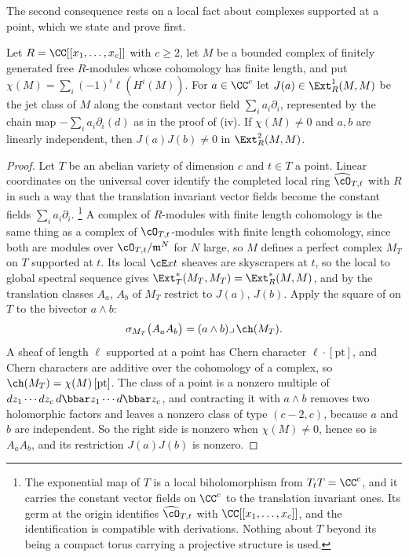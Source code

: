 The second consequence rests on a local fact about complexes supported at a
point, which we state and prove first.

\begin{lemma}
\label{lem:finiteproduct}
Let $R=\CC[[x_{1},\dots,x_{c}]]$ with $c\ge2$, let $M$ be a bounded complex of
finitely generated free $R$-modules whose cohomology has finite length, and
put $\chi(M)=\sum_{i}(-1)^{i}\ell(H^{i}(M))$. For $a\in\CC^{c}$ let
$J(a)\in\Ext^{1}_{R}(M,M)$ be the jet class of $M$ along the constant vector
field $\sum_{i}a_{i}\partial_{i}$, represented by the chain map
$-\sum_{i}a_{i}\partial_{i}(d)$ as in the proof of (iv).
If $\chi(M)\ne0$ and $a,b$ are linearly independent, then $J(a)J(b)\ne0$ in
$\Ext^{2}_{R}(M,M)$.
\end{lemma}

\begin{proof}
Let $T$ be an abelian variety of dimension $c$ and $t\in T$ a point. Linear
coordinates on the universal cover identify the completed local ring
$\widehat{\cO}_{T,t}$ with $R$ in such a way that the translation invariant
vector fields become the constant fields $\sum_{i}a_{i}\partial_{i}$.%
\footnote{The exponential map of $T$ is a local biholomorphism from
$T_{t}T=\CC^{c}$, and it carries the constant vector fields on $\CC^{c}$ to
the translation invariant ones. Its germ at the origin identifies
$\widehat{\cO}_{T,t}$ with $\CC[[x_{1},\dots,x_{c}]]$, and the identification
is compatible with derivations. Nothing about $T$ beyond its being a compact
torus carrying a projective structure is used.}
A complex of $R$-modules with finite length cohomology is the same thing as a
complex of $\cO_{T,t}$-modules with finite length cohomology, since both are
modules over $\cO_{T,t}/\mathfrak{m}^{N}$ for $N$ large, so $M$ defines a
perfect complex $M_{T}$ on $T$ supported at $t$. Its local $\cE xt$ sheaves are
skyscrapers at $t$, so the local to global spectral sequence gives
$\Ext^{*}_{T}(M_{T},M_{T})=\Ext^{*}_{R}(M,M)$, and by  the
translation classes $A_{a}$, $A_{b}$ of $M_{T}$ restrict to $J(a)$, $J(b)$.
Apply the square of  on $T$ to the bivector $a\wedge b$:
\[
  \sigma_{M_{T}}\bigl(A_{a}A_{b}\bigr)=(a\wedge b)\lrcorner\,\ch(M_{T}).
\]
A sheaf of length $\ell$ supported at a point has Chern character
$\ell\cdot[\mathrm{pt}]$, and Chern characters are additive over the
cohomology of a complex, so $\ch(M_{T})=\chi(M)\,[\mathrm{pt}]$. The class of a
point is a nonzero multiple of $dz_{1}\cdots dz_{c}\,d\bbar z_{1}\cdots
d\bbar z_{c}$, and contracting it with $a\wedge b$ removes two holomorphic
factors and leaves a nonzero class of type $(c-2,c)$, because $a$ and $b$ are
independent. So the right side is nonzero when $\chi(M)\ne0$, hence so is
$A_{a}A_{b}$, and its restriction $J(a)J(b)$ is nonzero.
\end{proof}


